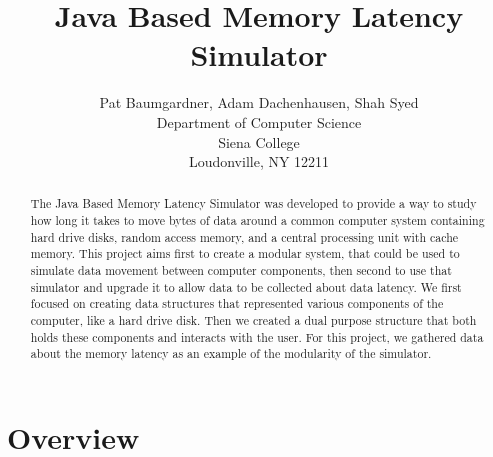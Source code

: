 \documentclass[12pt]{article}
\newcommand{\doublespace}{
  \protect\renewcommand\baselinestretch{1.5}
  \protect\normalsize
}
\begin{document}
\date{}

\title{Java Based Memory Latency Simulator}

\author{Pat Baumgardner, Adam Dachenhausen, Shah Syed\\
Department of Computer Science\\
Siena College\\
Loudonville, NY  12211
}

\maketitle
\thispagestyle{empty}

\begin{abstract}

The Java Based Memory Latency Simulator was developed to provide a way to
study how long it takes to move bytes of data around a common computer
system containing hard drive disks, random access memory, and a central
processing unit with cache memory. This project aims first to create a modular
system, that could be used to simulate data movement between computer components, then
second to use that simulator and upgrade it to allow data to be collected about
data latency. We first focused on creating data structures that represented various
components of the computer, like a hard drive disk. Then we created a dual purpose
structure that both holds these components and interacts with the user. For this project,
we gathered data about the memory latency as an example of the modularity of the simulator.
  
\end{abstract}

\doublespace

\section{Overview}
\label{sec:overview}
\end{document}
